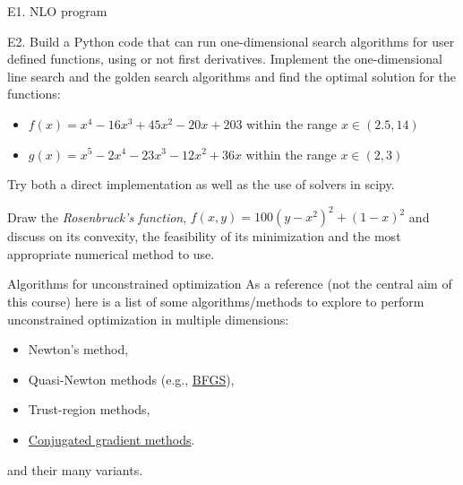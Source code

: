 \documentclass[c]{beamer}
\begin{document}
\begin{frame}[t]{E1. NLO program}
\begin{program}
  E2. Build a Python code that can run one-dimensional search algorithms for user defined functions, using or not first derivatives. Implement the one-dimensional line search and the golden search algorithms and find the optimal solution for the functions:
  \begin{itemize}
    \item $f(x)=x^4-16x^3+45 x^2-20x+203$ within the range $x\in(2.5,14)$
    \item $g(x)=x^5-2x^4-23x^3-12x^2+36x$ within the range $x\in(2,3)$
  \end{itemize}
  Try both a direct implementation as well as the use of solvers in scipy.
\end{program}

\begin{Exercise}
  Draw the {\em Rosenbruck's function}, $f(x,y)=100(y-x^2)^2+(1-x)^2$ and discuss on its convexity, the feasibility of its minimization and the most appropriate numerical method to use.
\end{Exercise}

\end{frame}


\begin{frame}{Algorithms for unconstrained optimization}
  As a reference (not the central aim of this course) here is a list of some algorithms/methods to explore to perform unconstrained optimization in multiple dimensions:
  \begin{itemize}
    \item Newton's method,
    \item Quasi-Newton methods (e.g., \href{https://machinelearningmastery.com/bfgs-optimization-in-python/}{BFGS}),
    \item Trust-region methods,
    \item \href{https://en.wikipedia.org/wiki/Conjugate_gradient_method}{Conjugated gradient methods}.
  \end{itemize}
  and their many variants.
\end{frame}
\end{document}
